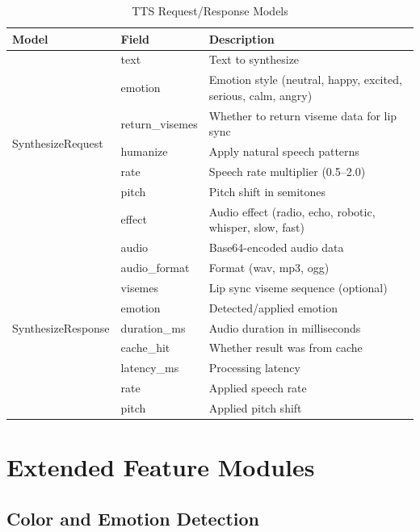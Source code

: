 \documentclass[12pt,a4paper,twoside]{report}
\begin{document}
\begin{table}[H]
\centering
{}
\begin{tabularx}{\textwidth}{|l|l|X|}
\hline
\rowcolor{phiblue!20}
\textbf{Model} & \textbf{Field} & \textbf{Description} \\
\hline
\multirow{7}{*}{SynthesizeRequest} & text & Text to synthesize \\
\cline{2-3}
 & emotion & Emotion style (neutral, happy, excited, serious, calm, angry) \\
\cline{2-3}
 & return\_visemes & Whether to return viseme data for lip sync \\
\cline{2-3}
 & humanize & Apply natural speech patterns \\
\cline{2-3}
 & rate & Speech rate multiplier (0.5--2.0) \\
\cline{2-3}
 & pitch & Pitch shift in semitones \\
\cline{2-3}
 & effect & Audio effect (radio, echo, robotic, whisper, slow, fast) \\
\hline
\multirow{9}{*}{SynthesizeResponse} & audio & Base64-encoded audio data \\
\cline{2-3}
 & audio\_format & Format (wav, mp3, ogg) \\
\cline{2-3}
 & visemes & Lip sync viseme sequence (optional) \\
\cline{2-3}
 & emotion & Detected/applied emotion \\
\cline{2-3}
 & duration\_ms & Audio duration in milliseconds \\
\cline{2-3}
 & cache\_hit & Whether result was from cache \\
\cline{2-3}
 & latency\_ms & Processing latency \\
\cline{2-3}
 & rate & Applied speech rate \\
\cline{2-3}
 & pitch & Applied pitch shift \\
\hline
\end{tabularx}
\caption{TTS Request/Response Models}
\end{table}

\chapter{Extended Feature Modules}

\section{Color and Emotion Detection}
\end{document}
